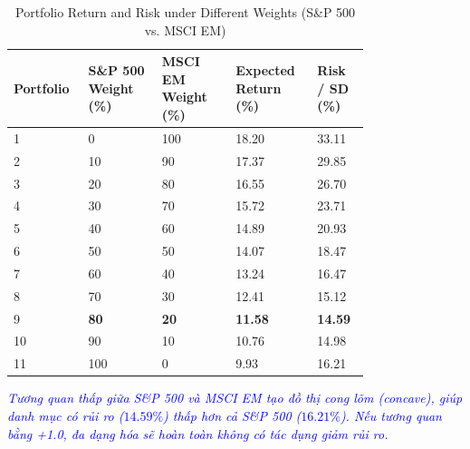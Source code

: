 \begin{table}[!htbp]
\centering
\caption{Portfolio Return and Risk under Different Weights (S\&P 500 vs. MSCI EM)}
\label{tab:portfolio_properties_weights_m8}
\begin{tabular}{p{0.12\linewidth}  p{0.18\linewidth}  p{0.18\linewidth}  p{0.18\linewidth}  p{0.12\linewidth}}
	\toprule
	\textbf{Portfolio} & \textbf{S\&P 500 Weight (\%)} & \textbf{MSCI EM Weight (\%)} & \textbf{Expected Return (\%)} & \textbf{Risk / SD (\%)} \\
	\midrule
	1 & 0 & 100 & 18.20 & 33.11 \\
	2 & 10 & 90 & 17.37 & 29.85 \\
	3 & 20 & 80 & 16.55 & 26.70 \\
	4 & 30 & 70 & 15.72 & 23.71 \\
	5 & 40 & 60 & 14.89 & 20.93 \\
	6 & 50 & 50 & 14.07 & 18.47 \\
	7 & 60 & 40 & 13.24 & 16.47 \\
	8 & 70 & 30 & 12.41 & 15.12 \\
	9 & \textbf{80} & \textbf{20} & \textbf{11.58} & \textbf{14.59} \\
	10 & 90 & 10 & 10.76 & 14.98 \\
	11 & 100 & 0 & 9.93 & 16.21 \\
	\bottomrule
\end{tabular}
\end{table}
\textcolor{blue}{\textit{Tương quan thấp giữa S\&P 500 và MSCI EM tạo đồ thị cong lõm (concave), giúp danh mục có rủi ro ($14.59\%$) thấp hơn cả S\&P 500 ($16.21\%$). Nếu tương quan bằng +1.0, đa dạng hóa sẽ hoàn toàn không có tác dụng giảm rủi ro.}}

